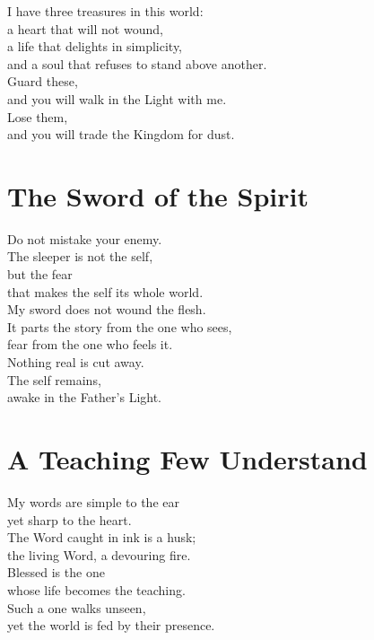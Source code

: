 \documentclass[10pt, openright]{book}
\newcommand{\sectionbreak}{\filbreak}
\newcommand{\sayingsource}[1]{\par\nopagebreak\vspace{0.3\baselineskip}{\raggedleft\footnotesize\itshape #1\par}}
\begin{document}
I have three treasures in this world:\\
a heart that will not wound,\\
a life that delights in simplicity,\\
and a soul that refuses to stand above another.\\
Guard these,\\
and you will walk in the Light with me.\\
Lose them,\\
and you will trade the Kingdom for dust.

\sayingsource{Tao Te Ching 67}

\sectionbreak

\section{The Sword of the Spirit}\label{the-sword-of-the-spirit}

Do not mistake your enemy.\\
The sleeper is not the self,\\
but the fear\\
that makes the self its whole world.\\
My sword does not wound the flesh.\\
It parts the story from the one who sees,\\
fear from the one who feels it.\\
Nothing real is cut away.\\
The self remains,\\
awake in the Father's Light.

\sayingsource{Tao Te Ching 69 · Matthew 10:34 · Thomas 16}

\sectionbreak

\section{A Teaching Few Understand}\label{a-teaching-few-understand}

My words are simple to the ear\\
yet sharp to the heart.\\
The Word caught in ink is a husk;\\
the living Word, a devouring fire.\\
Blessed is the one\\
whose life becomes the teaching.\\
Such a one walks unseen,\\
yet the world is fed by their presence.
\end{document}
